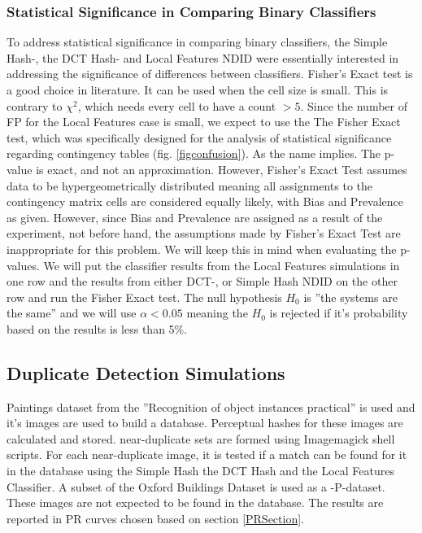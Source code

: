 \documentclass[english,12pt,a4paper,pdftex,elec,utf8, table]{aaltothesis}
\begin{document}
\subsubsection{Statistical Significance in Comparing Binary Classifiers}
To address statistical significance in comparing binary classifiers, the Simple Hash-, the DCT Hash- and Local Features NDID were essentially interested in addressing the significance of differences between classifiers. Fisher's Exact test is a good choice in literature. It can be used when the cell size is small. This is contrary to $\chi^2$, which needs every cell to have a count $>5$. Since the number of FP for the Local Features case is small, we expect to use the The Fisher Exact test, which was specifically designed for the analysis of statistical significance regarding contingency tables (fig. \ref{figconfusion}). As the name implies. The p-value is exact, and not an approximation. \cite{fisher1922interpretation}
However, Fisher's Exact Test assumes data to be hypergeometrically distributed meaning all assignments to the contingency matrix cells are considered equally likely, with Bias and Prevalence as given. However, since Bias and Prevalence are assigned as a result of the experiment, not before hand, the assumptions made by Fisher's Exact Test are inappropriate for this problem. We will keep this in mind when evaluating the p-values.
We will put the classifier results from the Local Features simulations in one row and the results from either DCT-, or Simple Hash NDID on the other row and run the Fisher Exact test. The null hypothesis $H_0$ is ''the systems are the same'' and we will use $\alpha < 0.05$ meaning the $H_0$ is rejected if it's probability based on the results is less than 5\%.

\subsection{Duplicate Detection Simulations}
Paintings dataset from the ''Recognition of object instances practical'' \cite{Vedaldi2012} is used and it's images are used to build a database. Perceptual hashes for these images are calculated and stored. near-duplicate sets are formed using Imagemagick shell scripts. For each near-duplicate image, it is tested if a match can be found for it in the database using the Simple Hash the DCT Hash and the Local Features Classifier. A subset of the Oxford Buildings Dataset \cite{PhilbinJamesArandjelovicReljaZisserman2012} is used as a -P-dataset. These images are not expected to be found in the database. The results are reported in PR curves chosen based on section \ref{PRSection}.
\end{document}
